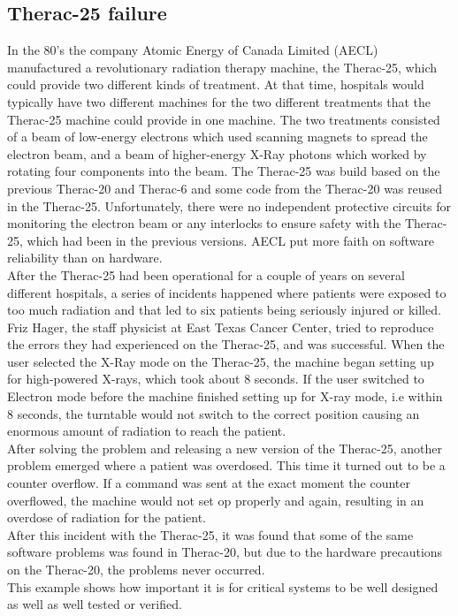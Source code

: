 \subsection{Therac-25 failure}
In the 80's the company Atomic Energy of Canada Limited (AECL) manufactured a revolutionary radiation therapy machine, the Therac-25\cite{Leveson1993}, which could provide two different kinds of treatment. At that time, hospitals would typically have two different machines for the two different treatments that the Therac-25 machine could provide in one machine. The two treatments consisted of a beam of low-energy electrons which used scanning magnets to spread the electron beam, and a beam of higher-energy X-Ray photons which worked by rotating four components into the beam. The Therac-25 was build based on the previous Therac-20 and Therac-6 and some code from the Therac-20 was reused in the Therac-25. Unfortunately, there were no independent protective circuits for monitoring the electron beam or any interlocks to ensure safety with the Therac-25, which had been in the previous versions. AECL put more faith on software reliability than on hardware. \\ After the Therac-25 had been operational for a couple of years on several different hospitals, a series of incidents happened where patients were exposed to too much radiation and that led to six patients being seriously injured or killed. Friz Hager, the staff physicist at East Texas Cancer Center, tried to reproduce the errors they had experienced on the Therac-25, and was successful. When the user selected the X-Ray mode on the Therac-25, the machine began setting up for high-powered X-rays, which took about 8 seconds. If the user switched to Electron mode before the machine finished setting up for X-ray mode, i.e within 8 seconds, the turntable would not switch to the correct position causing an enormous amount of radiation to reach the patient.\\
After solving the problem and releasing a new version of the Therac-25, another problem emerged where a patient was overdosed. This time it turned out to be a counter overflow. If a command was sent at the exact moment the counter overflowed, the machine would not set op properly and again, resulting in an overdose of radiation for the patient. \\
After this incident with the Therac-25, it was found that some of the same software problems was found in Therac-20, but due to the hardware precautions on the Therac-20, the problems never occurred.
\\ This example shows how important it is for critical systems to be well designed as well as well tested or verified.


